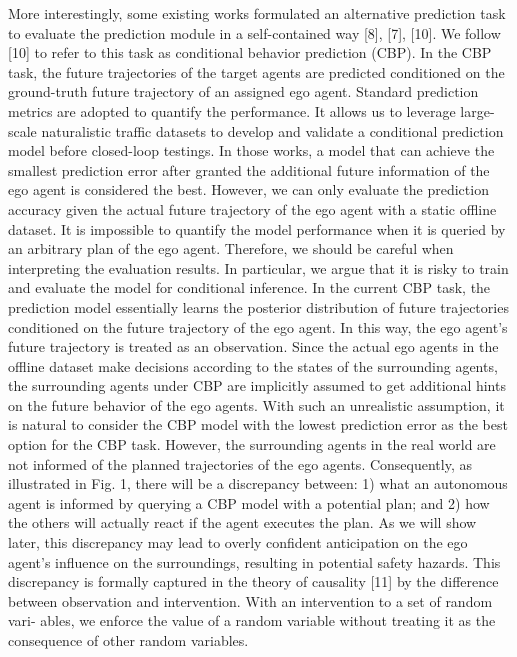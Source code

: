 More interestingly, some existing works formulated an
alternative prediction task to evaluate the prediction module
in a self-contained way [8], [7], [10]. We follow [10] to
refer to this task as conditional behavior prediction (CBP). In
the CBP task, the future trajectories of the target agents are
predicted conditioned on the ground-truth future trajectory
of an assigned ego agent. Standard prediction metrics are
adopted to quantify the performance. It allows us to leverage
large-scale naturalistic traffic datasets to develop and validate
a conditional prediction model before closed-loop testings. In
those works, a model that can achieve the smallest prediction
error after granted the additional future information of the
ego agent is considered the best. However, we can only
evaluate the prediction accuracy given the actual future
trajectory of the ego agent with a static offline dataset. It
is impossible to quantify the model performance when it is
queried by an arbitrary plan of the ego agent. Therefore, we
should be careful when interpreting the evaluation results.
In particular, we argue that it is risky to train and evaluate
the model for conditional inference. In the current CBP
task, the prediction model essentially learns the posterior
distribution of future trajectories conditioned on the future
trajectory of the ego agent. In this way, the ego agent’s
future trajectory is treated as an observation. Since the actual
ego agents in the offline dataset make decisions according to
the states of the surrounding agents, the surrounding agents
under CBP are implicitly assumed to get additional hints
on the future behavior of the ego agents. With such an
unrealistic assumption, it is natural to consider the CBP
model with the lowest prediction error as the best option
for the CBP task. However, the surrounding agents in the
real world are not informed of the planned trajectories of
the ego agents. Consequently, as illustrated in Fig. 1, there
will be a discrepancy between: 1) what an autonomous agent
is informed by querying a CBP model with a potential plan;
and 2) how the others will actually react if the agent executes
the plan. As we will show later, this discrepancy may lead
to overly confident anticipation on the ego agent’s influence
on the surroundings, resulting in potential safety hazards.
This discrepancy is formally captured in the theory of
causality [11] by the difference between observation and
intervention. With an intervention to a set of random vari-
ables, we enforce the value of a random variable without
treating it as the consequence of other random variables.

